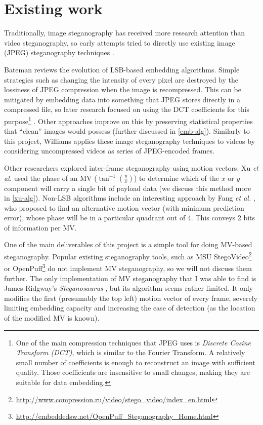 \documentclass[12pt,british,twoside,notitlepage,usenames,dvipsnames,hypens,final]{report}
\numberwithin{equation}{section}
\numberwithin{figure}{section}
\begin{document}
\section{Existing work}

Traditionally, image steganography has received more research attention than video steganography, so early attempts tried to directly use existing image (JPEG) steganography techniques \cite{bateman, jpegdctcoding}.

Bateman \cite{bateman} reviews the evolution of LSB-based embedding algorithms. Simple strategies such as changing the intensity of every pixel are destroyed by the lossiness of JPEG compression when the image is recompressed. This can be mitigated by embedding data into something that JPEG stores directly in a compressed file, so later research focused on using the DCT coefficients for this purpose\footnote{
One of the main compression techniques that JPEG uses is \emph{Discrete Cosine Transform (DCT)}, which is similar to the Fourier Transform. A relatively small number of coefficients is enough to reconstruct an image with sufficient quality. Those coefficients are insensitive to small changes, making they are suitable for data embedding.} \cite{jpegdctcoding}. Other approaches improve on this by preserving statistical properties that ``clean'' images would possess \cite{bateman, f5} (further discussed in \ref{emb-alg}). Similarly to this project, Williams \cite{scott-fs} applies these image steganography techniques to videos by considering uncompressed videos as series of JPEG-encoded frames.

Other researchers explored inter-frame steganography using motion vectors. Xu \emph{et al.} \cite{xu2006steganography} used the phase of an MV ($\tan^{-1}(\frac{y}{x})$) to determine which of the $x$ or $y$ component will carry a single bit of payload data (we discuss this method more in \ref{xu-alg}). Non-LSB algorithms include an interesting approach by Fang \emph{et al.} \cite{fang2006data}, who proposed to find an alternative motion vector (with minimum prediction error), whose phase will be in a particular quadrant out of 4. This conveys 2 bits of information per MV.

One of the main deliverables of this project is a simple tool for doing MV-based steganography. Popular existing steganography tools, such as MSU StegoVideo\footnote{\url{http://www.compression.ru/video/stego_video/index_en.html}} or OpenPuff\footnote{\url{http://embeddedsw.net/OpenPuff_Steganography_Home.html}} do not implement MV steganography, so we will not discuss them further. The only implementation of MV steganography that I was able to find is James Ridgway's \emph{Steganosaurus} \cite{steganosaurus}, but its algorithm seems rather limited. It only modifies the first (presumably the top left) motion vector of every frame, severely limiting embedding capacity and increasing the ease of detection (as the location of the modified MV is known).
\end{document}
